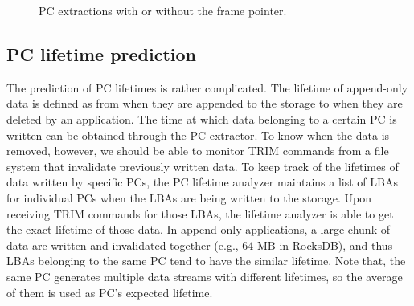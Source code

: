 \begin{figure}[t]
	\centering
	\vspace{-10pt}
	\caption{PC extractions with or without the frame pointer.}
	\label{fig:getpc}
	\vspace{-15pt}
\end{figure}


\vspace{-5pt}
\subsection{PC lifetime prediction}
The prediction of PC lifetimes is rather complicated. The lifetime of
append-only data is defined as from when they are appended to the storage to
when they are deleted by an application. The time at which data belonging to a
certain PC is written can be obtained through the PC extractor. To know when
the data is removed, however, we should be able to monitor TRIM commands from a
file system that invalidate previously written data.  To keep track of the
lifetimes of data written by specific PCs, the PC lifetime analyzer maintains a
list of LBAs for individual PCs when the LBAs are being written to the storage.
Upon receiving TRIM commands for those LBAs, the lifetime analyzer is able to
get the exact lifetime of those data. In append-only applications, a large
chunk of data are written and invalidated together (e.g., 64 MB in RocksDB), 
and thus LBAs belonging to the same PC tend to have the
similar lifetime. Note that, the same PC generates multiple data streams with
different lifetimes, so the average of them is used as PC's expected lifetime.


